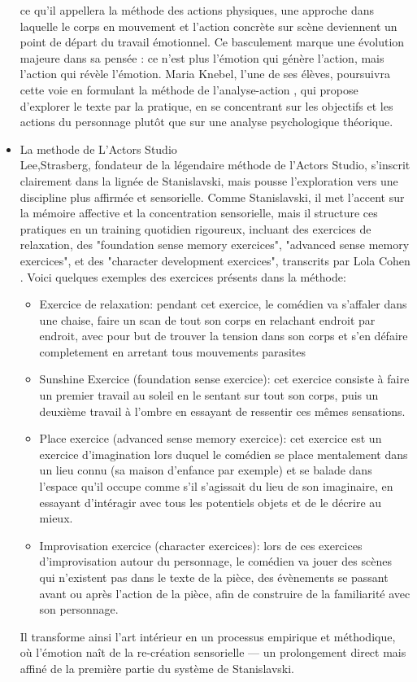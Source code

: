 \begin{itemize}
    ce qu’il appellera la méthode des actions physiques, une approche dans laquelle le corps en mouvement et l’action concrète sur 
    scène deviennent un point de départ du travail émotionnel. Ce basculement marque une évolution majeure dans sa pensée : 
    ce n’est plus l’émotion qui génère l’action, mais l’action qui révèle l’émotion. Maria Knebel, l'une de ses élèves, poursuivra 
    cette voie en formulant la méthode de l’analyse-action \cite{knebel2006analyseaction}, qui propose d’explorer le texte par la 
    pratique, en se concentrant sur les objectifs et les actions du personnage plutôt que sur une analyse psychologique théorique.
    \item La methode de L'Actors Studio
    \\
    Lee,Strasberg, fondateur de la légendaire méthode de l’Actors Studio, s’inscrit clairement dans la lignée de Stanislavski,
    mais pousse l’exploration vers une discipline plus affirmée et sensorielle. Comme Stanislavski, il met l’accent sur la mémoire
    affective et la concentration sensorielle, mais il structure ces pratiques en un training quotidien rigoureux, incluant des exercices de 
    relaxation, des "foundation sense memory exercices", "advanced sense memory exercices", et des "character development exercices",
    transcrits par Lola Cohen \cite{cohen2016method}. 
    Voici quelques exemples des exercices présents dans la méthode:
    \begin{itemize}
        \item Exercice de relaxation: pendant cet exercice, le comédien va s'affaler dans une chaise, faire un scan de tout son corps 
        en relachant endroit par endroit, avec pour but de trouver la tension dans son corps et s'en défaire completement en arretant 
        tous mouvements parasites
        \item Sunshine Exercice (foundation sense exercice): cet exercice consiste à faire un premier travail au soleil en le sentant sur 
        tout son corps, puis un deuxième travail à l'ombre en essayant de ressentir ces mêmes sensations.  
        \item Place exercice (advanced sense memory exercice): cet exercice est un exercice d'imagination  lors duquel le comédien se
        place mentalement dans un lieu connu (sa maison d'enfance par exemple) et se balade dans l'espace qu'il occupe comme s'il s'agissait 
        du lieu de son imaginaire, en essayant d'intéragir avec tous les potentiels objets et de le décrire au mieux.
        \item  Improvisation exercice (character exercices): lors de ces exercices d'improvisation autour du personnage, le comédien va 
        jouer des scènes qui n'existent pas dans le texte de la pièce, des évènements se passant avant ou après l'action de la pièce, afin 
        de construire de la familiarité avec son personnage. 
    \end{itemize}
    Il transforme ainsi l’art intérieur en un processus empirique et méthodique, 
    où l’émotion naît de la re-création sensorielle — un prolongement direct mais affiné de la première partie du système de Stanislavski.
    
\end{itemize}


